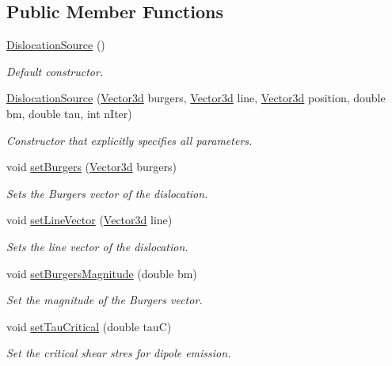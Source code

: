\subsection*{Public Member Functions}
\begin{DoxyCompactItemize}
\item 
\hyperlink{classDislocationSource_afc9b7984d9486354b6f3d82033707577}{Dislocation\-Source} ()
\begin{DoxyCompactList}\small\item\em Default constructor. \end{DoxyCompactList}\item 
\hyperlink{classDislocationSource_aa5adcc1a0862d8cfa6d8d1a632c3855f}{Dislocation\-Source} (\hyperlink{classVector3d}{Vector3d} burgers, \hyperlink{classVector3d}{Vector3d} line, \hyperlink{classVector3d}{Vector3d} position, double bm, double tau, int n\-Iter)
\begin{DoxyCompactList}\small\item\em Constructor that explicitly specifies all parameters. \end{DoxyCompactList}\item 
void \hyperlink{classDislocationSource_ae1a26d9f8149206b884436f44e92f4c3}{set\-Burgers} (\hyperlink{classVector3d}{Vector3d} burgers)
\begin{DoxyCompactList}\small\item\em Sets the Burgers vector of the dislocation. \end{DoxyCompactList}\item 
void \hyperlink{classDislocationSource_adf7d0b496f5935909daf071a0d733b17}{set\-Line\-Vector} (\hyperlink{classVector3d}{Vector3d} line)
\begin{DoxyCompactList}\small\item\em Sets the line vector of the dislocation. \end{DoxyCompactList}\item 
void \hyperlink{classDislocationSource_a41c1f953f9ad57a2b1a9b8d412980d91}{set\-Burgers\-Magnitude} (double bm)
\begin{DoxyCompactList}\small\item\em Set the magnitude of the Burgers vector. \end{DoxyCompactList}\item 
void \hyperlink{classDislocationSource_a3294cb807ec8dd0e1fa6ab6e51eeafa2}{set\-Tau\-Critical} (double tau\-C)
\begin{DoxyCompactList}\small\item\em Set the critical shear stres for dipole emission. \end{DoxyCompactList}\item 

\end{DoxyCompactItemize}

